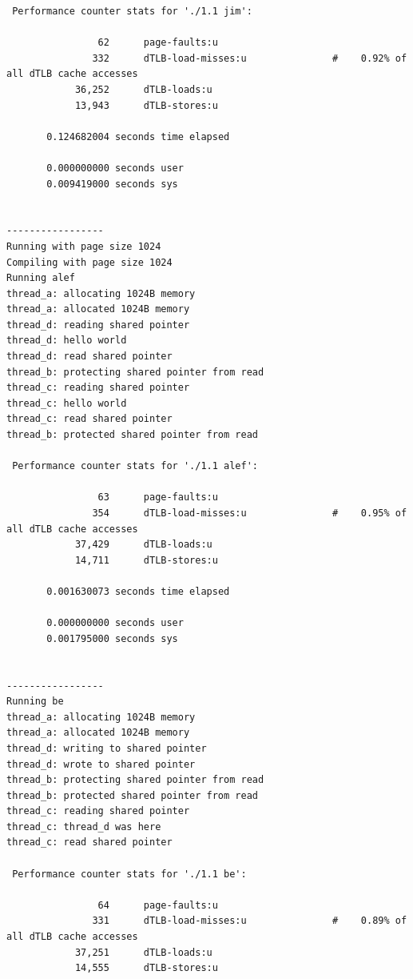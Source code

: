 \documentclass{article}
\begin{document}
\begin{latin}
\begin{lstlisting}
 Performance counter stats for './1.1 jim':

                62      page-faults:u                                                         
               332      dTLB-load-misses:u               #    0.92% of all dTLB cache accesses
            36,252      dTLB-loads:u                                                          
            13,943      dTLB-stores:u                                                         

       0.124682004 seconds time elapsed

       0.000000000 seconds user
       0.009419000 seconds sys


-----------------
Running with page size 1024
Compiling with page size 1024
Running alef
thread_a: allocating 1024B memory
thread_a: allocated 1024B memory
thread_d: reading shared pointer
thread_d: hello world
thread_d: read shared pointer
thread_b: protecting shared pointer from read
thread_c: reading shared pointer
thread_c: hello world
thread_c: read shared pointer
thread_b: protected shared pointer from read

 Performance counter stats for './1.1 alef':

                63      page-faults:u                                                         
               354      dTLB-load-misses:u               #    0.95% of all dTLB cache accesses
            37,429      dTLB-loads:u                                                          
            14,711      dTLB-stores:u                                                         

       0.001630073 seconds time elapsed

       0.000000000 seconds user
       0.001795000 seconds sys


-----------------
Running be
thread_a: allocating 1024B memory
thread_a: allocated 1024B memory
thread_d: writing to shared pointer
thread_d: wrote to shared pointer
thread_b: protecting shared pointer from read
thread_b: protected shared pointer from read
thread_c: reading shared pointer
thread_c: thread_d was here
thread_c: read shared pointer

 Performance counter stats for './1.1 be':

                64      page-faults:u                                                         
               331      dTLB-load-misses:u               #    0.89% of all dTLB cache accesses
            37,251      dTLB-loads:u                                                          
            14,555      dTLB-stores:u                                                         


\end{lstlisting}
\end{latin}
\end{document}
